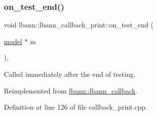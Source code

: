 \subsubsection{\texorpdfstring{on\+\_\+test\+\_\+end()}{on\_test\_end()}}
{\footnotesize\ttfamily void lbann\+::lbann\+\_\+callback\+\_\+print\+::on\+\_\+test\+\_\+end (\begin{DoxyParamCaption}\item[{\hyperlink{classlbann_1_1model}{model} $\ast$}]{m }\end{DoxyParamCaption})\hspace{0.3cm}{\ttfamily [override]}, {\ttfamily [virtual]}}

Called immediately after the end of testing. 

Reimplemented from \hyperlink{classlbann_1_1lbann__callback_accbad4dd004c1ced33642db6398b2efe}{lbann\+::lbann\+\_\+callback}.



Definition at line 126 of file callback\+\_\+print.\+cpp.


